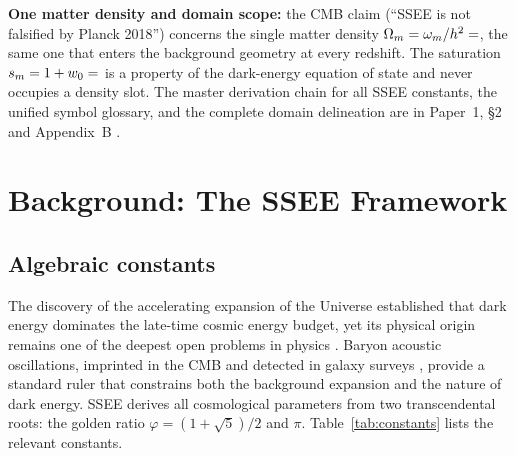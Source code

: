 \documentclass[12pt,a4paper]{article}
\begin{document}
\begin{abstract}
parameters (with $H_0$, $\omega_b$, $\omega_c$ and $n_s$ algebraically fixed) against
the $k=6$ $\Lambda$CDM baseline, the two models reach statistically indistinguishable
best fits (minimum $\chi^2_{\rm SSEE}=\val{b1_chi2_ssee}$ vs.\ $\chi^2_{\Lambda\rm CDM}=\val{b1_chi2_lcdm}$ over
$N=\val{b1_N}$ data points, $\Delta\chi^2_{\rm min}=\val{b1_dchi2}$), while the parameter-count economy
yields $\Delta\mathrm{BIC}=\val{b1_dBIC}$, very strong evidence for SSEE on the scale of
\citet{KassRaftery1995}. (A \texttt{plik\_lite} cross-check, with $\{A_s,\tau\}$ also
minimized, gives a more conservative $\Delta\mathrm{BIC}=\val{lite_dBIC}$.) The $\Delta\mathrm{BIC}$ is driven by parsimony, not by
fit quality.
SSEE is not falsified by the Planck~2018 CMB power spectra.
\end{abstract}

\noindent\textbf{One matter density and domain scope:}
the CMB claim (``SSEE is not falsified by Planck 2018'') concerns the single
matter density $\Omega_m=\omega_m/h^2=\val{OMEGA_M_TOTAL_d6}$, the same one that enters the
background geometry at every redshift. The saturation $s_m=1+w_0=\val{S_M_d6}$ is a
property of the dark-energy equation of state and never occupies a density slot.
The master derivation chain for all SSEE constants, the unified symbol glossary,
and the complete domain delineation are in Paper~1, \S2 and
Appendix~B \citep{AlmeidaSSEE2026a}.


\clearpage
{\small\tableofcontents}
\clearpage

\section{Background: The SSEE Framework}
\label{sec:framework}

\subsection{Algebraic constants}

The discovery of the accelerating expansion of the Universe
\citep{Riess1998,Perlmutter1999} established that dark energy dominates the
late-time cosmic energy budget, yet its physical origin remains one of the
deepest open problems in physics \citep{Weinberg1989}.
Baryon acoustic oscillations, imprinted in the CMB and detected in galaxy surveys
\citep{Eisenstein2005}, provide a standard ruler that constrains both the
background expansion and the nature of dark energy.
SSEE derives all cosmological parameters from two transcendental roots:
the golden ratio $\varphi=(1+\sqrt{5})/2$ and $\pi$.
Table~\ref{tab:constants} lists the relevant constants.
\end{document}
